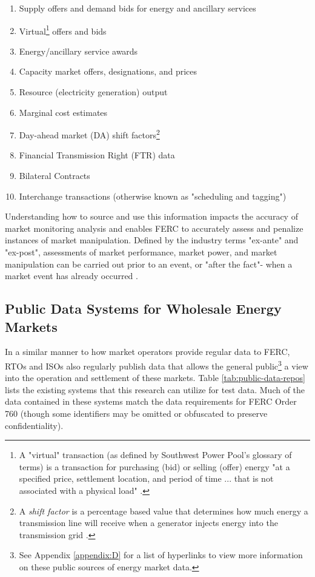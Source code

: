 \begin{enumerate}
    \item{Supply offers and demand bids for energy and ancillary services}
    \item{Virtual\footnote{A "virtual" transaction (as defined by Southwest Power Pool's glossary of terms) is a transaction for purchasing (bid) or selling (offer) energy "at a specified price, settlement location, and period of time ... that is not associated with a physical load" \cite{spp-virtual-bid-offer}.} offers and bids}
    \item{Energy/ancillary service awards}
    \item{Capacity market offers, designations, and prices}
    \item{Resource (electricity generation) output}
    \item{Marginal cost estimates}
    \item{Day-ahead market (DA) shift factors\footnote{A \textit{shift factor} is a percentage based value that determines how much energy a transmission line will receive when a generator injects energy into the transmission grid \cite{epe-shift-factor}.}}
    \item{Financial Transmission Right (FTR) data}
    \item{Bilateral Contracts}
    \item{Interchange transactions (otherwise known as "scheduling and tagging")}
\end{enumerate}

Understanding how to source and use this information impacts the accuracy of market monitoring analysis and enables FERC to accurately assess and penalize instances of market manipulation. Defined by the industry terms "ex-ante" and "ex-post", assessments of market performance, market power, and market manipulation can be carried out prior to an event, or "after the fact"- when a market event has already occurred \cite{green-neuhoff-newberry}.

\subsection{Public Data Systems for Wholesale Energy Markets}

In a similar manner to how market operators provide regular data to FERC, RTOs and ISOs also regularly publish data that allows the general public\footnote{See Appendix \ref{appendix:D} for a list of hyperlinks to view more information on these public sources of energy market data.} a view into the operation and settlement of these markets. Table \ref{tab:public-data-repos} lists the existing systems that this research can utilize for test data. Much of the data contained in these systems match the data requirements for FERC Order 760 (though some identifiers may be omitted or obfuscated to preserve confidentiality).  

